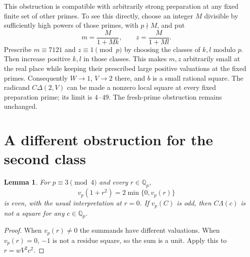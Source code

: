 \documentclass[11pt,a4paper]{article}
\newcommand{\Q}{\mathbb Q}\newcommand{\Z}{\mathbb Z}
\newtheorem{lemma}{Lemma}
\begin{document}
This obstruction is compatible with arbitrarily strong preparation
at any fixed finite set of other primes. To see this directly, choose
an integer $M$ divisible by sufficiently high powers of those primes,
with $p\nmid M$, and put
\[
                         m=\frac{M}{1+Mk},\qquad
                         z=\frac{M}{1+Ml}.
\]
Prescribe $m\equiv7121$ and $z\equiv1\pmod p$ by choosing
the classes of $k,l$ modulo $p$. Then increase positive $k,l$
in those classes. This makes $m,z$ arbitrarily small at the real
place while keeping their prescribed large positive valuations
at the fixed primes. Consequently $W\to1$, $V\to2$ there,
and $b$ is a small rational square. The radicand $C\Delta(2,V)$
can be made a nonzero local square at every fixed preparation
prime; its limit is $4\cdot49$. The fresh-prime obstruction
remains unchanged.

\section{A different obstruction for the second class}

\begin{lemma}\label{lem:secondlocal}
For $p\equiv3\pmod4$ and every $r\in\Q_p$,
\[
                         v_p(1+r^2)=2\min\{0,v_p(r)\}
\]
is even, with the usual interpretation at $r=0$. If $v_p(C)$
is odd, then $C\Lambda(c)$ is not a square for any
$c\in\Q_p$.
\end{lemma}
\begin{proof}
When $v_p(r)\ne0$ the summands have different valuations.
When $v_p(r)=0$, $-1$ is not a residue square, so the sum is
a unit. Apply this to $r=wV^2c^2$.
\end{proof}
\end{document}
